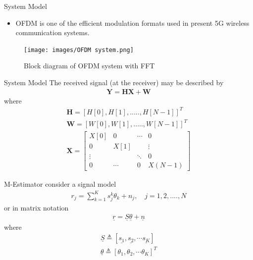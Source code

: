 \documentclass{beamer}
\begin{document}
\begin{frame}{System Model}
\begin{itemize}
    \item OFDM is one of the efficient modulation formats used in present 5G wireless communication systems.
\end{itemize}
\begin{figure}
    \centering
    \texttt{[image: images/OFDM system.png]}
    \caption{Block diagram of OFDM system with FFT}
    \label{fig:OFDM}
\end{figure}
    
\end{frame}
\begin{frame}{System Model}
The received signal (at the receiver) may be described by\\
\begin{align}
    \mathbf{Y=HX+W}
\end{align}
where
\begin{align}
    \mathbf{H}=\left[ H[0], H[1],....., H[N-1]  \right]^{T}\\
    \mathbf{W}=\left[ W[0], W[1],....., W[N-1]  \right]^{T}\\
    \mathbf{X}=\begin{bmatrix}
    X[0] & 0 & \cdots & 0\\
    0    & X[1] &  &  \vdots\\
    \vdots &  & \ddots & 0\\
    0 & \cdots &0 & X(N-1)
    \end{bmatrix}
\end{align}
    
\end{frame}



\begin{frame}{M-Estimator}
consider a  signal model
\begin{align}
    r_{j}=\sum_{k=1}^{K} s_{j}^{k} \theta _{k} + n_{j}  , \quad j=1,2,....,N
    \end{align}
     or in matrix notation
    \begin{align}
    \underline{r}=\underline{S} \underline{\theta} + \underline{n}
\end{align}
where
\begin{align}
    \underline{S}\triangleq \left[ \underline{s_{1}}, \underline{s_{2}},    \cdots    \underline{s_{K}}\right]\\
    \underline{\theta } \triangleq \left[ \theta _{1},  \theta _{2}, \cdots  \theta _{K} \right]^{T}
\end{align}
\end{frame}
\end{document}
